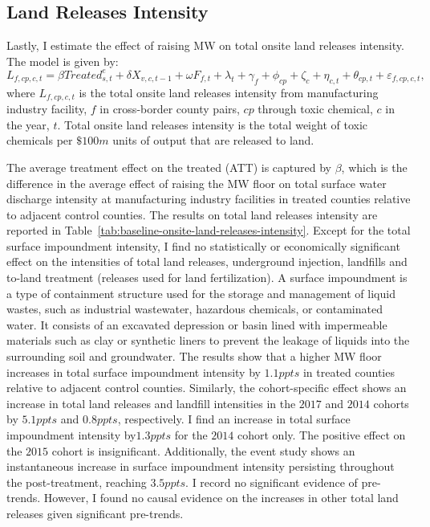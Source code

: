 \documentclass[12pt, english]{article}
\begin{document}
    \subsection{Land Releases Intensity}\label{subsec:land-releases-intensity}
    Lastly, I estimate the effect of raising MW on total onsite land releases intensity. The model is given by:
    \begin{equation}
        L_{f,cp,c,t} = \beta Treated_{s,t}^e + \delta X_{v,c,t-1} + \omega F_{f,t} + \lambda_{t} + \gamma_{f} + \phi_{cp} + \zeta_{c} + \eta_{c,t} + \theta_{cp,t} + \varepsilon_{f,cp,c,t},\label{eq:baseline-onsite-land-releases-intensity}
    \end{equation}
    where $L_{f,cp,c,t}$ is the total onsite land releases intensity from manufacturing industry facility, $f$ in cross-border county pairs, $cp$ through toxic chemical, $c$ in the year, $t$. Total onsite land releases intensity is the total weight of toxic chemicals per $\$100m$ units of output that are released to land.
    

    The average treatment effect on the treated (ATT) is captured by $\beta$, which is the difference in the average effect of raising the MW floor on total surface water discharge intensity at manufacturing industry facilities in treated counties relative to adjacent control counties. The results on total land releases intensity are reported in Table~\ref{tab:baseline-onsite-land-releases-intensity}. Except for the total surface impoundment intensity, I find no statistically or economically significant effect on the intensities of total land releases, underground injection, landfills and to-land treatment (releases used for land fertilization). A surface impoundment is a type of containment structure used for the storage and management of liquid wastes, such as industrial wastewater, hazardous chemicals, or contaminated water. It consists of an excavated depression or basin lined with impermeable materials such as clay or synthetic liners to prevent the leakage of liquids into the surrounding soil and groundwater. The results show that a higher MW floor increases in total surface impoundment intensity by $1.1ppts$ in treated counties relative to adjacent control counties. Similarly, the cohort-specific effect shows an increase in total land releases and landfill intensities in the $2017$ and $2014$ cohorts by $5.1ppts$ and $0.8ppts$, respectively. I find an increase in total surface impoundment intensity by$1.3ppts$ for the $2014$ cohort only. The positive effect on the $2015$ cohort is insignificant. Additionally, the event study shows an instantaneous increase in surface impoundment intensity persisting throughout the post-treatment, reaching $3.5ppts$. I record no significant evidence of pre-trends. However, I found no causal evidence on the increases in other total land releases given significant pre-trends.
    
\end{document}
